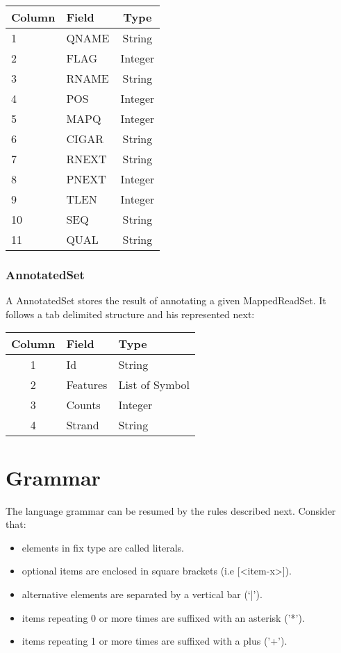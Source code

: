 \documentclass{article}
\begin{document}
\begin{table}[H]
    \center
    \begin{tabular}{llc}
    \hline
    Column & Field              & Type            \\ 
    \hline
    1 & QNAME   & String  \\
    2 & FLAG    & Integer \\
    3 & RNAME   & String  \\    
    4 & POS     & Integer \\
    5 & MAPQ    & Integer \\
    6 & CIGAR   & String  \\
    7 & RNEXT   & String  \\    
    8 & PNEXT   & Integer \\
    9 & TLEN    & Integer \\
    10 & SEQ    & String  \\
    11 & QUAL   & String  \\
    \end{tabular}
\end{table}

\subsubsection{AnnotatedSet}
A AnnotatedSet stores the result of annotating a given MappedReadSet. It follows a tab delimited structure and his represented next:

\begin{table}[H]
    \center
    \begin{tabular}{cll}
    \hline
    Column & Field & Type   \\ 
    \hline
    1 & Id      & String    \\
    2 & Features & List of Symbol \\
    3 & Counts   & Integer   \\    
    4 & Strand  & String    \\
    \end{tabular}
\end{table}

\section{Grammar}

The language grammar can be resumed by the rules described next. Consider that:
\begin{itemize}
    \item elements in fix type are called literals.
    \item optional items are enclosed in square brackets (i.e [<item-x>]).
    \item alternative elements are separated by a vertical bar (`|').
    \item items repeating 0 or more times are suffixed with an asterisk ('*').
    \item items repeating 1 or more times are suffixed with a plus ('+'). 
\end{itemize}
\end{document}

